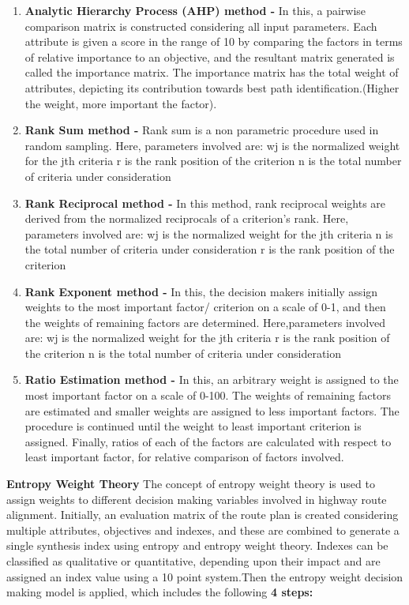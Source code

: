 \begin{enumerate}
\item \textbf{Analytic Hierarchy Process (AHP) method - }
In this, a pairwise comparison matrix is constructed considering all input parameters. Each  attribute is given a score in the range of 10 by comparing the factors in terms of relative importance to an objective, and the resultant matrix generated is called the importance matrix. The importance matrix has the total weight of attributes, depicting its contribution towards best path identification.(Higher the weight, more important the factor).

\item \textbf{Rank Sum method - }
Rank sum is a non parametric procedure used in random sampling. 
Here, parameters involved are: 
wj is the normalized weight for the jth criteria
r is the rank position of the criterion
n is the total number of criteria under consideration

\item \textbf{Rank Reciprocal method - }
In this method, rank reciprocal weights are derived from the normalized reciprocals of a criterion’s rank.
Here, parameters involved are: 
wj is the normalized weight for the jth criteria
n is the total number of criteria under consideration 
r is the rank position of the criterion

\item \textbf{Rank Exponent method - }
In this, the decision makers initially assign weights to the most important factor/ criterion on a scale of 0-1, and then the weights of remaining factors are determined. 
Here,parameters involved are:
wj is the normalized weight for the jth criteria
r is the rank position of the criterion
n is the total number of criteria under consideration 

\item \textbf{ Ratio Estimation method - }
In this, an arbitrary weight is assigned to the most important factor on a scale of 0-100. The weights of remaining factors are estimated and smaller weights are assigned to less important factors. The procedure is continued until the weight to least important criterion is assigned. Finally, ratios of each of the factors are calculated with respect to least important factor, for relative comparison of factors involved.
\end{enumerate}
 \textbf{Entropy Weight Theory}
The concept of entropy weight theory is used to assign weights to different decision making variables involved in highway route alignment. Initially, an evaluation matrix of the route plan is created considering multiple attributes, objectives and indexes, and these are combined to generate a single synthesis index using entropy and entropy weight theory. Indexes can be classified as qualitative or quantitative, depending upon their impact and are assigned an index value using a 10 point system.Then the entropy weight decision making model is applied, which includes the following \textbf{4 steps:}
